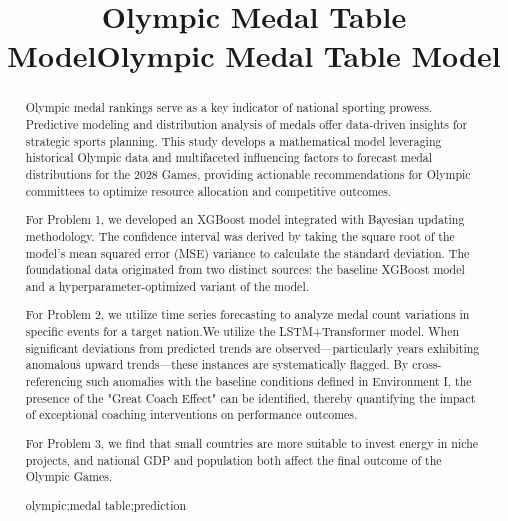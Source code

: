 \documentclass{mcmthesis}
\title{Olympic Medal Table Model}
\title{Olympic Medal Table Model}
\begin{document}
\begin{abstract}

Olympic medal rankings serve as a key indicator of national sporting prowess. Predictive modeling and distribution analysis of medals offer data-driven insights for strategic sports planning. This study develops a mathematical model leveraging historical Olympic data and multifaceted influencing factors to forecast medal distributions for the 2028 Games, providing actionable recommendations for Olympic committees to optimize resource allocation and competitive outcomes.

For Problem 1, we developed an XGBoost model integrated with Bayesian updating methodology. The confidence interval was derived by taking the square root of the model's mean squared error (MSE) variance to calculate the standard deviation. The foundational data originated from two distinct sources: the baseline XGBoost model and a hyperparameter-optimized variant of the model.

For Problem 2, we utilize time series forecasting to analyze medal count variations in specific events for a target nation.We utilize the LSTM+Transformer model. When significant deviations from predicted trends are observed—particularly years exhibiting anomalous upward trends—these instances are systematically flagged. By cross-referencing such anomalies with the baseline conditions defined in Environment I, the presence of the "Great Coach Effect" can be identified, thereby quantifying the impact of exceptional coaching interventions on performance outcomes.

For Problem 3, we find that small countries are more suitable to invest energy in niche projects, and national GDP and population both affect the final outcome of the Olympic Games.

\begin{keywords}
olympic;medal table;prediction
\end{keywords}
\end{abstract}
\maketitle

 \tableofcontents
 \newpage


\end{document}
